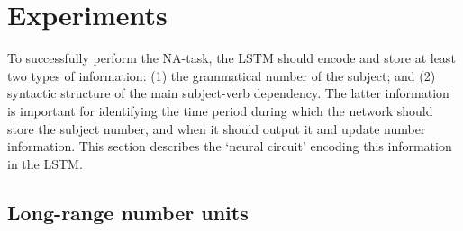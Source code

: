 \section{Experiments}\label{sec:results}
To successfully perform the NA-task, the LSTM should encode and store at least two types of information: (1) the grammatical number of the subject; and (2) syntactic structure of the main subject-verb dependency. The latter information is important for identifying the time period during which the network should store the subject number,  and when it should output it and update number information. This section describes the `neural circuit' encoding this information in the LSTM.

\subsection{Long-range number units}\label{subsec:ablation}
